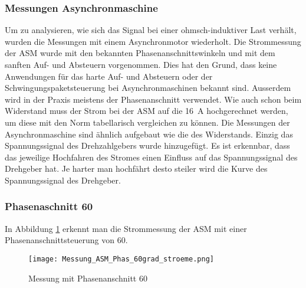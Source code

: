 \newpage
\subsubsection{Messungen Asynchronmaschine}
Um zu analysieren, wie sich das Signal bei einer ohmsch-induktiver Last verhält, wurden die Messungen mit einem Asynchronmotor wiederholt. Die Strommessung der ASM wurde mit den bekannten Phasenanschnittswinkeln und mit dem sanften Auf- und Absteuern vorgenommen. Dies hat den Grund, dass keine Anwendungen für das harte Auf- und Absteuern oder der Schwingungspaketsteuerung bei Asynchronmaschinen bekannt sind. Ausserdem wird in der Praxis meistens der Phasenanschnitt verwendet. Wie auch schon beim Widerstand muss der Strom bei der ASM auf die \SI{16}{A} hochgerechnet werden, um diese mit den Norm tabellarisch vergleichen zu können. Die Messungen der Asynchronmaschine sind ähnlich aufgebaut wie die des Widerstands. Einzig das Spannungssignal des Drehzahlgebers wurde hinzugefügt. Es ist erkennbar, dass das jeweilige Hochfahren des Stromes einen Einfluss auf das Spannungssignal des Drehgeber hat. Je harter man hochfährt desto steiler wird die Kurve des Spannungssignal des Drehgeber. 


\subsubsection*{Phasenaschnitt 60\textdegree}
In Abbildung \ref{fig:Mess_Phas_60grad_stroeme} erkennt man die Strommessung der ASM mit einer Phasenanschnittsteuerung von 60\textdegree\hspace{0.02cm}.

\begin{figure}[ht!]
	\centering
	\texttt{[image: Messung\_ASM\_Phas\_60grad\_stroeme.png]}	
	\caption{Messung mit Phasenanschnitt 60\textdegree}\label{fig:Mess_Phas_60grad_stroeme}
\end{figure}

